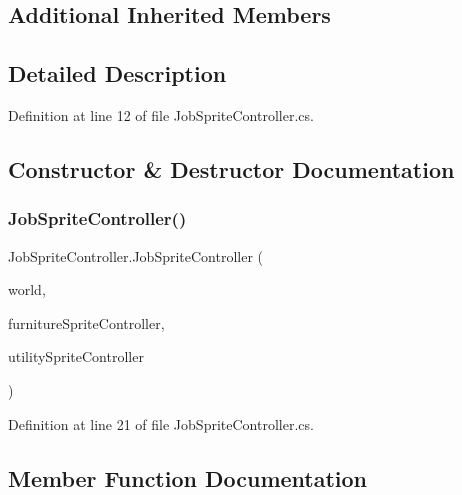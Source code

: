 \subsection*{Additional Inherited Members}


\subsection{Detailed Description}


Definition at line 12 of file Job\+Sprite\+Controller.\+cs.



\subsection{Constructor \& Destructor Documentation}
\mbox{\label{class_job_sprite_controller_a10fc503c1e338bd2aaa518166397dcd8}} 
\subsubsection{\texorpdfstring{Job\+Sprite\+Controller()}{JobSpriteController()}}
{\footnotesize\ttfamily Job\+Sprite\+Controller.\+Job\+Sprite\+Controller (\begin{DoxyParamCaption}\item[{\hyperlink{class_world}{World}}]{world,  }\item[{\hyperlink{class_furniture_sprite_controller}{Furniture\+Sprite\+Controller}}]{furniture\+Sprite\+Controller,  }\item[{\hyperlink{class_utility_sprite_controller}{Utility\+Sprite\+Controller}}]{utility\+Sprite\+Controller }\end{DoxyParamCaption})}



Definition at line 21 of file Job\+Sprite\+Controller.\+cs.



\subsection{Member Function Documentation}
\mbox{\label{class_job_sprite_controller_a874ad305f04327c47898e55f0f7940da}} 
